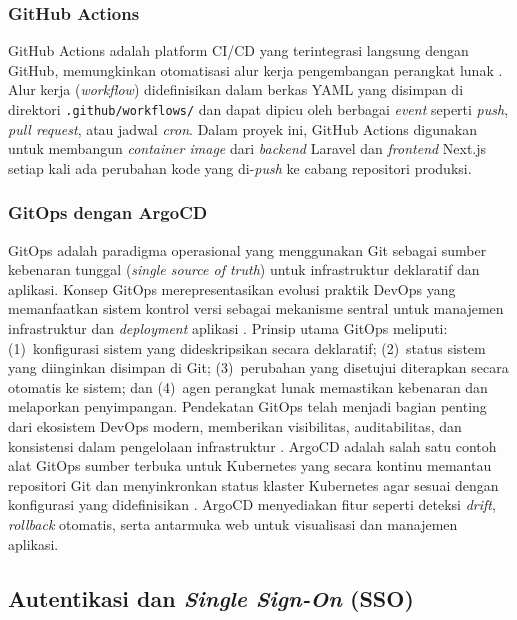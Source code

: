 \subsubsection{GitHub Actions}

GitHub Actions adalah platform CI/CD yang terintegrasi langsung dengan GitHub, memungkinkan otomatisasi alur kerja pengembangan perangkat lunak \citep{GitHubActions_2024_Docs}. Alur kerja (\textit{workflow}) didefinisikan dalam berkas YAML yang disimpan di direktori \texttt{.github/workflows/} dan dapat dipicu oleh berbagai \textit{event} seperti \textit{push}, \textit{pull request}, atau jadwal \textit{cron}. Dalam proyek ini, GitHub Actions digunakan untuk membangun \textit{container image} dari \textit{backend} Laravel dan \textit{frontend} Next.js setiap kali ada perubahan kode yang di-\textit{push} ke cabang repositori produksi.

\subsubsection{GitOps dengan ArgoCD}

GitOps adalah paradigma operasional yang menggunakan Git sebagai sumber kebenaran tunggal (\textit{single source of truth}) untuk infrastruktur deklaratif dan aplikasi. Konsep GitOps merepresentasikan evolusi praktik DevOps yang memanfaatkan sistem kontrol versi sebagai mekanisme sentral untuk manajemen infrastruktur dan \textit{deployment} aplikasi \citep{Beetz_2022_GitOps}. Prinsip utama GitOps meliputi: (1)~konfigurasi sistem yang dideskripsikan secara deklaratif; (2)~status sistem yang diinginkan disimpan di Git; (3)~perubahan yang disetujui diterapkan secara otomatis ke sistem; dan (4)~agen perangkat lunak memastikan kebenaran dan melaporkan penyimpangan. Pendekatan GitOps telah menjadi bagian penting dari ekosistem DevOps modern, memberikan visibilitas, auditabilitas, dan konsistensi dalam pengelolaan infrastruktur \citep{Leite_2019_GitOps}. ArgoCD adalah salah satu contoh alat GitOps sumber terbuka untuk Kubernetes yang secara kontinu memantau repositori Git dan menyinkronkan status klaster Kubernetes agar sesuai dengan konfigurasi yang didefinisikan \citep{ArgoCD_2024_Docs}. ArgoCD menyediakan fitur seperti deteksi \textit{drift}, \textit{rollback} otomatis, serta antarmuka web untuk visualisasi dan manajemen aplikasi.

\subsection{Autentikasi dan \textit{Single Sign-On} (SSO)}

